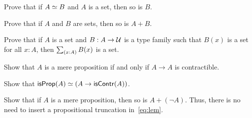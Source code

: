 \documentclass[hott-all.tex]{subfiles}
\begin{document}
%

%
\begin{ex}\label{ex:equiv-functor-set}
  Prove that if $A \simeq B$ and $A$ is a set, then so is $B$.
\end{ex}

\begin{ex}\label{ex:isset-coprod}
  Prove that if $A$ and $B$ are sets, then so is $A+B$.
\end{ex}

\begin{ex}\label{ex:isset-sigma}
  Prove that if $A$ is a set and $B:A\to \mathcal{U}$ is a type family such that $B(x)$ is a set for all $x:A$, then $\sm{x:A} B(x)$ is a set.
\end{ex}

\begin{ex}\label{ex:prop-endocontr}
  Show that $A$ is a mere proposition if and only if $A\to A$ is contractible.
\end{ex}

\begin{ex}\label{ex:prop-inhabcontr}
  Show that $\mathsf{isProp}(A) \simeq (A\to\mathsf{isContr}(A))$.
\end{ex}

\begin{ex}\label{ex:lem-mereprop}
  Show that if $A$ is a mere proposition, then so is $A+(\neg A)$.
  Thus, there is no need to insert a propositional truncation in~\eqref{eq:lem}.
\end{ex}
\end{document}
